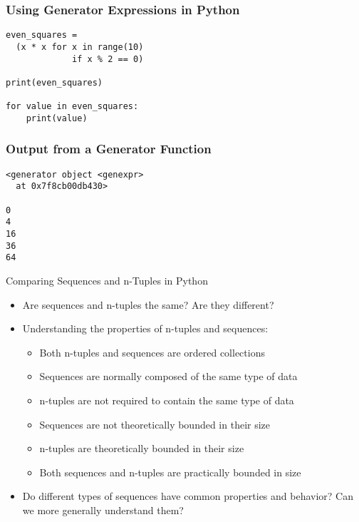 \documentclass[14pt,aspectratio=169]{beamer}
\begin{document}
%
\begin{frame}[fragile]
  \frametitle{Using Generator Expressions in Python}
  \normalsize
  \begin{minipage}{6in}
    \vspace*{.2in}
    \begin{verbatim}
even_squares =
  (x * x for x in range(10)
             if x % 2 == 0)

print(even_squares)

for value in even_squares:
    print(value)
    \end{verbatim}
  \end{minipage}
\end{frame}

%
\begin{frame}[fragile]
  \frametitle{Output from a Generator Function}
  \normalsize
  \hspace*{.1in}
  \begin{minipage}{6in}
    \vspace*{.2in}
    \begin{verbatim}
<generator object <genexpr>
  at 0x7f8cb00db430>

0
4
16
36
64
    \end{verbatim}
  \end{minipage}
\end{frame}

%
\begin{frame}{Comparing Sequences and n-Tuples in Python}
  \begin{itemize}
    \item Are sequences and n-tuples the same? Are they different?
      \vspace*{-.15in}
    \item Understanding the properties of n-tuples and sequences:
      \begin{itemize}
        \item Both n-tuples and sequences are ordered collections
        \item Sequences are normally composed of the same type of data
        \item n-tuples are not required to contain the same type of data
        \item Sequences are not theoretically bounded in their size
        \item n-tuples are theoretically bounded in their size
        \item Both sequences and n-tuples are practically bounded in size
      \end{itemize}
      \vspace*{-.2in}
    \item Do different types of sequences have common properties and behavior?
      Can we more generally understand them?
  \end{itemize}
\end{frame}
\end{document}
